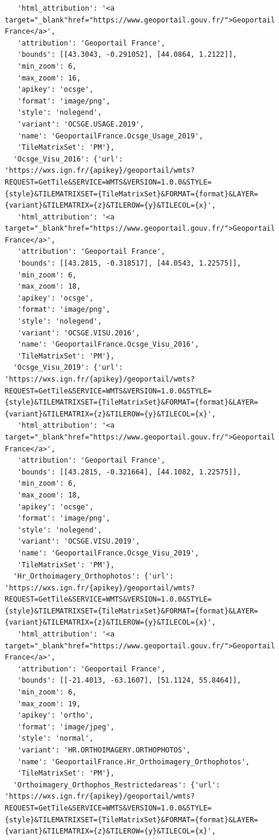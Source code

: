 \documentclass[
  letterpaper,
  DIV=11,
  numbers=noendperiod]{scrreprt}
\begin{document}
\begin{verbatim}
   'html_attribution': '<a target="_blank"href="https://www.geoportail.gouv.fr/">Geoportail France</a>',
   'attribution': 'Geoportail France',
   'bounds': [[43.3043, -0.291052], [44.0864, 1.2122]],
   'min_zoom': 6,
   'max_zoom': 16,
   'apikey': 'ocsge',
   'format': 'image/png',
   'style': 'nolegend',
   'variant': 'OCSGE.USAGE.2019',
   'name': 'GeoportailFrance.Ocsge_Usage_2019',
   'TileMatrixSet': 'PM'},
  'Ocsge_Visu_2016': {'url': 'https://wxs.ign.fr/{apikey}/geoportail/wmts?REQUEST=GetTile&SERVICE=WMTS&VERSION=1.0.0&STYLE={style}&TILEMATRIXSET={TileMatrixSet}&FORMAT={format}&LAYER={variant}&TILEMATRIX={z}&TILEROW={y}&TILECOL={x}',
   'html_attribution': '<a target="_blank"href="https://www.geoportail.gouv.fr/">Geoportail France</a>',
   'attribution': 'Geoportail France',
   'bounds': [[43.2815, -0.318517], [44.0543, 1.22575]],
   'min_zoom': 6,
   'max_zoom': 18,
   'apikey': 'ocsge',
   'format': 'image/png',
   'style': 'nolegend',
   'variant': 'OCSGE.VISU.2016',
   'name': 'GeoportailFrance.Ocsge_Visu_2016',
   'TileMatrixSet': 'PM'},
  'Ocsge_Visu_2019': {'url': 'https://wxs.ign.fr/{apikey}/geoportail/wmts?REQUEST=GetTile&SERVICE=WMTS&VERSION=1.0.0&STYLE={style}&TILEMATRIXSET={TileMatrixSet}&FORMAT={format}&LAYER={variant}&TILEMATRIX={z}&TILEROW={y}&TILECOL={x}',
   'html_attribution': '<a target="_blank"href="https://www.geoportail.gouv.fr/">Geoportail France</a>',
   'attribution': 'Geoportail France',
   'bounds': [[43.2815, -0.321664], [44.1082, 1.22575]],
   'min_zoom': 6,
   'max_zoom': 18,
   'apikey': 'ocsge',
   'format': 'image/png',
   'style': 'nolegend',
   'variant': 'OCSGE.VISU.2019',
   'name': 'GeoportailFrance.Ocsge_Visu_2019',
   'TileMatrixSet': 'PM'},
  'Hr_Orthoimagery_Orthophotos': {'url': 'https://wxs.ign.fr/{apikey}/geoportail/wmts?REQUEST=GetTile&SERVICE=WMTS&VERSION=1.0.0&STYLE={style}&TILEMATRIXSET={TileMatrixSet}&FORMAT={format}&LAYER={variant}&TILEMATRIX={z}&TILEROW={y}&TILECOL={x}',
   'html_attribution': '<a target="_blank"href="https://www.geoportail.gouv.fr/">Geoportail France</a>',
   'attribution': 'Geoportail France',
   'bounds': [[-21.4013, -63.1607], [51.1124, 55.8464]],
   'min_zoom': 6,
   'max_zoom': 19,
   'apikey': 'ortho',
   'format': 'image/jpeg',
   'style': 'normal',
   'variant': 'HR.ORTHOIMAGERY.ORTHOPHOTOS',
   'name': 'GeoportailFrance.Hr_Orthoimagery_Orthophotos',
   'TileMatrixSet': 'PM'},
  'Orthoimagery_Orthophos_Restrictedareas': {'url': 'https://wxs.ign.fr/{apikey}/geoportail/wmts?REQUEST=GetTile&SERVICE=WMTS&VERSION=1.0.0&STYLE={style}&TILEMATRIXSET={TileMatrixSet}&FORMAT={format}&LAYER={variant}&TILEMATRIX={z}&TILEROW={y}&TILECOL={x}',

\end{verbatim}
\end{document}
